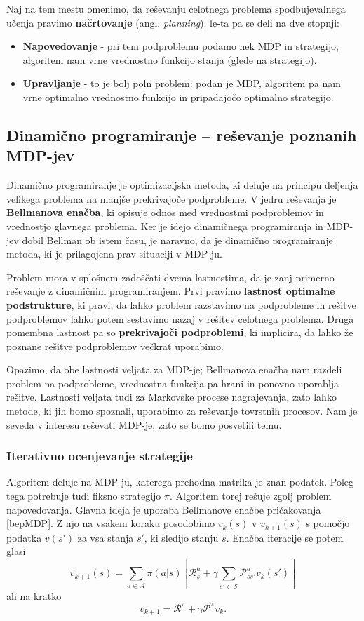 \documentclass[12pt,a4paper]{amsart}
\theoremstyle{definition} %
\theoremstyle{plain} %
\begin{document}
Naj na tem mestu omenimo, da reševanju celotnega problema spodbujevalnega učenja 
pravimo \textbf{načrtovanje} (angl. \textit{planning}), le-ta pa se deli na dve stopnji: 

\begin{itemize}
    \item \textbf{Napovedovanje} - pri tem podproblemu podamo nek MDP in strategijo, algoritem nam 
            vrne vrednostno funkcijo stanja (glede na strategijo).   
    \item \textbf{Upravljanje} - to je bolj poln problem: podan je MDP, algoritem pa nam vrne 
            optimalno vrednostno funkcijo in pripadajočo optimalno strategijo.
\end{itemize}

\subsection{Dinamično programiranje -- reševanje poznanih MDP-jev}
Dinamično programiranje je optimizacijska metoda, ki deluje na principu deljenja velikega problema 
na manjše prekrivajoče podprobleme. V jedru reševanja je \textbf{Bellmanova enačba}, ki opisuje 
odnos med vrednostmi podproblemov in vrednostjo glavnega problema. Ker je idejo dinamičnega 
programiranja in MDP-jev dobil Bellman ob istem času, je naravno, da je dinamično programiranje 
metoda, ki je prilagojena prav situaciji v MDP-ju.

Problem mora v splošnem zadoščati dvema lastnostima, da je zanj primerno reševanje z dinamičnim 
programiranjem. Prvi pravimo \textbf{lastnost optimalne podstrukture}, ki pravi, da lahko problem 
razstavimo na podprobleme in rešitve podproblemov lahko potem sestavimo nazaj v rešitev celotnega 
problema. Druga pomembna lastnost pa so \textbf{prekrivajoči podproblemi}, ki implicira, da lahko 
že poznane rešitve podproblemov večkrat uporabimo.

Opazimo, da obe lastnosti veljata za MDP-je; Bellmanova enačba nam razdeli problem na 
podprobleme, vrednostna funkcija pa hrani in ponovno uporablja rešitve. Lastnosti veljata tudi 
za Markovske procese nagrajevanja, zato lahko metode, ki jih bomo spoznali, uporabimo za reševanje
tovrstnih procesov. Nam je seveda v interesu reševati MDP-je, zato se bomo posvetili temu.

\subsubsection{Iterativno ocenjevanje strategije}
Algoritem deluje na MDP-ju, katerega prehodna matrika je znan podatek. Poleg tega potrebuje tudi 
fiksno strategijo $\pi$. Algoritem torej rešuje zgolj problem napovedovanja. Glavna ideja je uporaba 
Bellmanove enačbe pričakovanja \eqref{bepMDP}. Z njo na vsakem koraku posodobimo $v_k(s)$ v 
$v_{k+1}(s)$ s pomočjo podatka $v(s')$ za vsa stanja $s'$, ki sledijo stanju $s$. Enačba iteracije se 
potem glasi 
$$
v_{k+1}(s) = \sum_{a \in \mathcal{A}} \pi(a|s) \left[ \mathcal{R}_s^a + 
    \gamma \sum_{s' \in \mathcal{S}} \mathcal{P}_{ss'}^a v_k(s') \right] 
$$
ali na kratko
$$
v_{k+1} = \mathcal{R}^\pi + \gamma \mathcal{P}^\pi v_k.
$$
\end{document}

